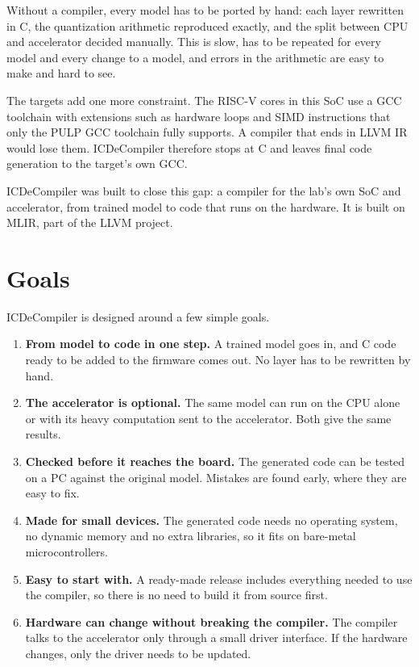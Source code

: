 \documentclass[11pt,a4paper]{article}
\begin{document}
Without a compiler, every model has to be ported by hand: each layer rewritten
in C, the quantization arithmetic reproduced exactly, and the split between CPU
and accelerator decided manually. This is slow, has to be repeated for every
model and every change to a model, and errors in the arithmetic are easy to
make and hard to see.

The targets add one more constraint. The RISC-V cores in this SoC use a GCC
toolchain with extensions such as hardware loops and SIMD instructions that
only the PULP GCC toolchain fully supports. A compiler that ends in LLVM IR
would lose them. ICDeCompiler therefore stops at C and leaves final code
generation to the target's own GCC.

ICDeCompiler was built to close this gap: a compiler for the lab's own SoC and
accelerator, from trained model to code that runs on the hardware. It is built
on MLIR, part of the LLVM project.

\section{Goals}

ICDeCompiler is designed around a few simple goals.

\begin{enumerate}
  \item \textbf{From model to code in one step.} A trained model goes in, and
    C code ready to be added to the firmware comes out. No layer has to be
    rewritten by hand.

  \item \textbf{The accelerator is optional.} The same model can run on the
    CPU alone or with its heavy computation sent to the accelerator. Both give
    the same results.

  \item \textbf{Checked before it reaches the board.} The generated code can
    be tested on a PC against the original model. Mistakes are found early,
    where they are easy to fix.

  \item \textbf{Made for small devices.} The generated code needs no operating
    system, no dynamic memory and no extra libraries, so it fits on bare-metal
    microcontrollers.

  \item \textbf{Easy to start with.} A ready-made release includes everything
    needed to use the compiler, so there is no need to build it from source
    first.

  \item \textbf{Hardware can change without breaking the compiler.} The
    compiler talks to the accelerator only through a small driver interface.
    If the hardware changes, only the driver needs to be updated.
\end{enumerate}
\end{document}
